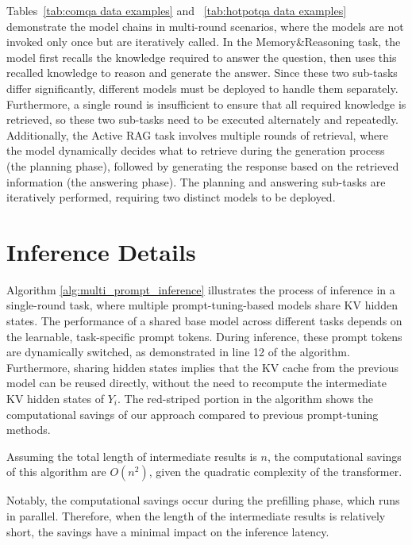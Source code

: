Tables~\ref{tab:comqa data examples} and ~\ref{tab:hotpotqa data examples} demonstrate the model chains in multi-round scenarios, where the models are not invoked only once but are iteratively called. In the Memory\&Reasoning task, the model first recalls the knowledge required to answer the question, then uses this recalled knowledge to reason and generate the answer. Since these two sub-tasks differ significantly, different models must be deployed to handle them separately. Furthermore, a single round is insufficient to ensure that all required knowledge is retrieved, so these two sub-tasks need to be executed alternately and repeatedly. Additionally, the Active RAG task involves multiple rounds of retrieval, where the model dynamically decides what to retrieve during the generation process (the planning phase), followed by generating the response based on the retrieved information (the answering phase). The planning and answering sub-tasks are iteratively performed, requiring two distinct models to be deployed.


\section{Inference Details}

Algorithm \ref{alg:multi_prompt_inference} illustrates the process of inference in a single-round task, where multiple prompt-tuning-based models share KV hidden states. The performance of a shared base model across different tasks depends on the learnable, task-specific prompt tokens. During inference, these prompt tokens are dynamically switched, as demonstrated in line 12 of the algorithm. Furthermore, sharing hidden states implies that the KV cache from the previous model can be reused directly, without the need to recompute the intermediate KV hidden states of \( Y_i \). The red-striped portion in the algorithm shows the computational savings of our approach compared to previous prompt-tuning methods.

Assuming the total length of intermediate results is $n$, the computational savings of this algorithm are $O(n^2)$, given the quadratic complexity of the transformer.

Notably, the computational savings occur during the prefilling phase, which runs in parallel. Therefore, when the length of the intermediate results is relatively short, the savings have a minimal impact on the inference latency.


